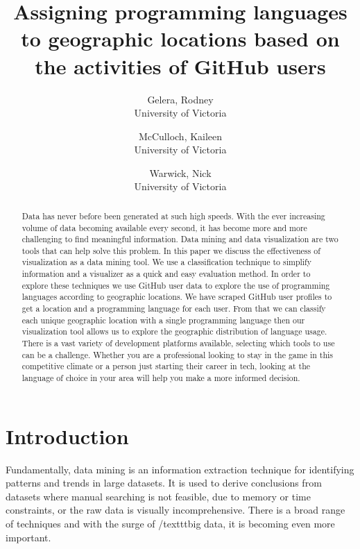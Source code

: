 \documentclass[11pt]{article}
\begin{document}
\title{Assigning programming languages to geographic locations based on the activities of GitHub users}

\author{
   Gelera, Rodney \\University of Victoria
   \and
   McCulloch, Kaileen \\University of Victoria
   \and
   Warwick, Nick \\University of Victoria
}

\maketitle

\tableofcontents
\listoffigures
\newpage

\begin{abstract}
Data has never before been generated at such high speeds. With the ever increasing volume of data becoming available every second, it has become more and more challenging to find meaningful information. Data mining and data visualization are two tools that can help solve this problem. In this paper we discuss the effectiveness of visualization as a data mining tool. We use a classification technique to simplify information and a visualizer as a quick and easy evaluation method. In order to explore these techniques we  use GitHub user data to explore the use of programming languages according to geographic locations. We have scraped GitHub user profiles to get a location and a programming language for each user. From that we can classify each unique geographic location with a single programming language then our visualization tool allows us to explore the geographic distribution of language usage. There is a vast variety of development platforms available, selecting which tools to use can be a challenge. Whether you are a professional looking to stay in the game in this competitive climate or a person just starting their career in tech, looking at the language of choice in your area will help you make a more informed decision.

\end{abstract}

\section{Introduction}
Fundamentally, data mining is an information extraction technique for identifying patterns and trends in large datasets. It is used to derive conclusions from datasets where manual searching is not feasible, due to memory or time constraints, or the raw data is visually incomprehensive. There is a broad range of techniques and with the surge of /texttt{big data}, it is becoming even more important.
\end{document}
